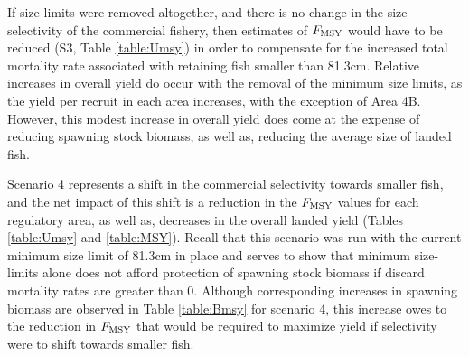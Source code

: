 If size-limits were removed altogether, and there is no change in the size-selectivity of the commercial fishery, then estimates of $F_{\rm{MSY}}$ would have to be reduced (S3, Table \ref{table:Umsy}) in order to compensate for the increased total mortality rate associated with retaining fish smaller than 81.3cm.  Relative increases in overall yield do occur with the removal of the minimum size limits, as the yield per recruit in each area increases, with the exception of Area 4B.  However, this modest increase in overall yield does come at the expense of reducing spawning stock biomass, as well as, reducing the average size of landed fish.

Scenario 4 represents a shift in the commercial selectivity towards smaller fish, and the net impact of this shift is a reduction in the $F_{\rm{MSY}}$ values for each regulatory area, as well as, decreases in the overall landed yield (Tables \ref{table:Umsy} and \ref{table:MSY}).  Recall that this scenario was run with the current minimum size limit of 81.3cm in place and serves to show that minimum size-limits alone does not afford protection of spawning stock biomass if discard mortality rates are greater than 0.  Although corresponding increases in spawning biomass are observed in Table \ref{table:Bmsy} for scenario 4, this increase owes to the reduction in $F_{\rm{MSY}}$ that would be required to maximize yield if selectivity were to shift towards smaller fish.

